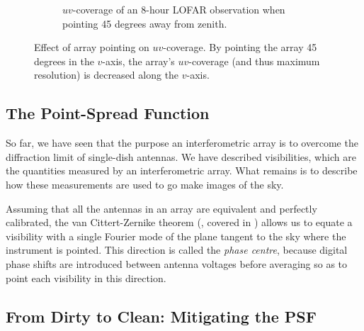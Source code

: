 \begin{figure}[ht]
\begin{subfigure}{.40\textwidth}
\caption{\label{fig.lofar.uvcoverage.elsewhere} $uv$-coverage of an 8-hour LOFAR observation when pointing 45 degrees away from zenith.}
\end{subfigure}
\caption{\label{fig.uvcoverage.lofar} Effect of array pointing on $uv$-coverage. By pointing the array 45 degrees in the $v$-axis, the array's $uv$-coverage (and thus maximum resolution) is decreased along the $v$-axis.}
\end{figure}


\subsection{The Point-Spread Function}\label{sec.imag.psf}

\pg
So far, we have seen that the purpose an interferometric array is to overcome the diffraction limit of single-dish antennas. We have described visibilities, which are the quantities measured by an interferometric array. What remains is to describe how these measurements are used to go make images of the sky.

\pg
Assuming that all the antennas in an array are equivalent and perfectly calibrated, the van Cittert-Zernike theorem (, covered in ) allows us to equate a visibility with a single Fourier mode of the plane tangent to the sky where the instrument is pointed. This direction is called the \emph{phase centre}, because digital phase shifts are introduced between antenna voltages before averaging so as to point each visibility in this direction. 

\subsection{From Dirty to Clean: Mitigating the PSF}
